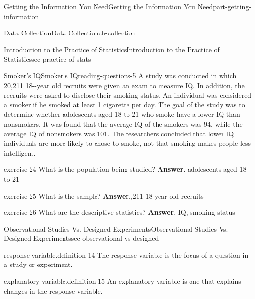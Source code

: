 \documentclass[oneside,10pt,]{book}
\numberwithin{equation}{section}
\begin{document}
\begin{partptx}{Getting the Information You Need}{}{Getting the Information You Need}{}{}{part-getting-information}
\begin{chapterptx}{Data Collection}{}{Data Collection}{}{}{ch-collection}
\begin{sectionptx}{Introduction to the Practice of Statistics}{}{Introduction to the Practice of Statistics}{}{}{sec-practice-of-stats}
%
%
\typeout{************************************************}
\typeout{************************************************}
%
\begin{reading-questions-subsection-numberless}{Smoker's IQ}{}{Smoker's IQ}{}{}{reading-questions-5}
\hypertarget{p-5}{}%
A study was conducted in which 20,211 18-{}-{}year old recruits were given an exam to measure IQ. In addition, the recruits were asked to disclose their smoking status. An individual was considered a smoker if he smoked at least 1 cigarette per day. The goal of the study was to determine whether adolescents aged 18 to 21 who smoke have a lower IQ than nonsmokers. It was found that the average IQ of the smokers was 94, while the average IQ of nonsmokers was 101. The researchers concluded that lower IQ individuals are more likely to chose to smoke, not that smoking makes people less intelligent.%
\begin{divisionexercise}{1}{}{}{exercise-24}%
What is the population being studied? \textbf{Answer}.\hypertarget{answer-24}{}\quad%
adolescents aged 18 to 21\end{divisionexercise}%
\begin{divisionexercise}{2}{}{}{exercise-25}%
What is the sample? \textbf{Answer}.\hypertarget{answer-25}{},211 18 year old recruits\end{divisionexercise}%
\begin{divisionexercise}{3}{}{}{exercise-26}%
What are the descriptive statistics? \textbf{Answer}.\hypertarget{answer-26}{}\quad%
IQ, smoking status\end{divisionexercise}%
\end{reading-questions-subsection-numberless}
\end{sectionptx}
%
%
\typeout{************************************************}
\typeout{************************************************}
%
\begin{sectionptx}{Observational Studies Vs. Designed Experiments}{}{Observational Studies Vs. Designed Experiments}{}{}{sec-observational-vs-designed}
\begin{definition}{response variable.}{definition-14}%
The response variable is the focus of a question in a study or experiment.\end{definition}
\begin{definition}{explanatory variable.}{definition-15}%
An explanatory variable is one that explains changes in the response variable.\end{definition}

\end{sectionptx}
\end{chapterptx}
\end{partptx}
\end{document}
